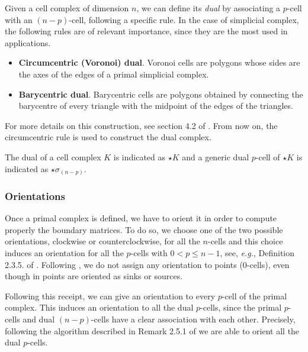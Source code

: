 \documentclass{article}
\theoremstyle{definition} %
\theoremstyle{plain} %
\theoremstyle{remark} %
\begin{document}
Given a cell complex of dimension $n$, we can define its \textsl{dual} by associating a $p$-cell with an $(n-p)$-cell, following a specific rule. In the case of simplicial complex, the following rules are of relevant importance, since they are the most used in applications.
\begin{itemize}
    \item \textbf{Circumcentric (Voronoi) dual}. Voronoi cells are polygons whose sides are the axes of the edges of a primal simplicial complex.
    \item \textbf{Barycentric dual}. Barycentric cells are polygons obtained by connecting the barycentre of every triangle with the midpoint of the edges of the triangles.
\end{itemize}

For more details on this construction, see section 4.2 of \cite{tonti2013mathematical}. From now on, the circumcentric rule is used to construct the dual complex.

The dual of a cell complex $K$ is indicated as $\star K$ and a generic dual $p$-cell of $\star K$ is indicated as $\star \sigma_{(n-p)}$.

\subsubsection{Orientations}

Once a primal complex is defined, we have to orient it in order to compute properly the boundary matrices. To do so, we choose one of the two possible orientations, clockwise or counterclockwise, for all the $n$-cells and this choice induces an orientation for all the $p$-cells with $0 < p \leq n-1$, see, \textsl{e.g.}, Definition 2.3.5. of \cite{hirani2003discrete}. 
Following \cite{hirani2003discrete}, we do not assign any orientation to points ($0$-cells), even though in \cite{tonti2013mathematical} points are oriented as sinks or sources.

Following this receipt, we can give an orientation to every $p$-cell of the primal complex. This induces an orientation to all the dual $p$-cells, since the primal $p$-cells and dual $(n-p)$-cells have a clear association with each other.
Precisely, following the algorithm described in Remark 2.5.1 of \cite{hirani2003discrete} we are able to orient all the dual $p$-cells.
\end{document}
